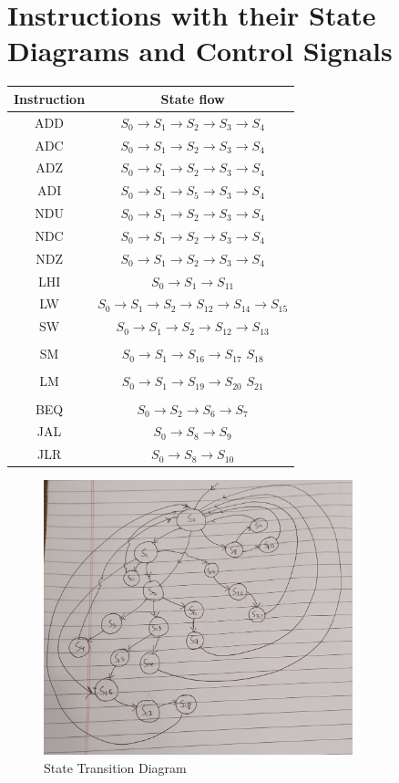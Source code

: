 \documentclass[]{report}
\begin{document}
    \section*{Instructions with their State Diagrams and Control Signals}
        \begin{center}
            \begin{tabular}{|c|c|}
                \hline
                Instruction & State flow\\
                \hline
                ADD & $S_0 \to S_1 \to S_2 \to S_3 \to S_4$\\
                ADC & $S_0 \to S_1 \to S_2 \to S_3 \to S_4$\\
                ADZ & $S_0 \to S_1 \to S_2 \to S_3 \to S_4$\\
                ADI & $S_0 \to S_1 \to S_5 \to S_3 \to S_4$\\
                NDU & $S_0 \to S_1 \to S_2 \to S_3 \to S_4$\\
                NDC & $S_0 \to S_1 \to S_2 \to S_3 \to S_4$\\
                NDZ & $S_0 \to S_1 \to S_2 \to S_3 \to S_4$\\
                LHI & $S_0 \to S_1 \to S_{11}$\\
                LW & $S_0 \to S_1 \to S_2 \to S_{12} \to S_{14} \to S_{15}$\\
                SW & $S_0 \to S_1 \to S_2 \to S_{12} \to S_{13}$\\
                & \\
                SM & $S_0 \to S_1 \to S_{16} \to S_{17} $  $ S_{18}$\\
                & \\
                LM & $S_0 \to S_1 \to S_{19} \to S_{20} $  $ S_{21}$\\
                & \\
                BEQ & $S_0 \to S_2 \to S_6 \to S_7$\\
                JAL & $S_0 \to S_8 \to S_9$\\
                JLR & $S_0 \to S_8 \to S_{10}$\\
                \hline
            \end{tabular}
        \end{center} 
        \begin{figure}[H]
            \begin{center}
                \includegraphics*[width=0.8\textwidth]{StateDiagram.jpg}
                \caption{State Transition Diagram}
            \end{center}
        \end{figure}
            
\end{document}
